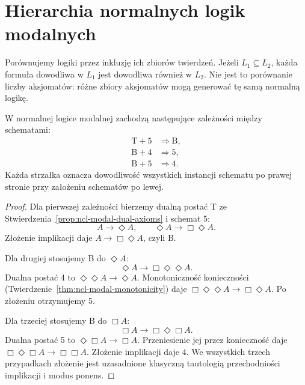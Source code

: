 \section{Hierarchia normalnych logik modalnych}

Porównujemy logiki przez inkluzję ich zbiorów twierdzeń.
Jeżeli $L_1\subseteq L_2$, każda formuła dowodliwa
w $L_1$ jest dowodliwa również w $L_2$.
Nie jest to porównanie liczby aksjomatów:
różne zbiory aksjomatów mogą generować tę samą
normalną logikę.

\begin{lemat}
\label{lem:ncl-modal-axiom-dependencies}
W normalnej logice modalnej zachodzą następujące
zależności między schematami:
\[
\begin{aligned}
 \mathrm T+5&\Longrightarrow\mathrm B,\\
 \mathrm B+4&\Longrightarrow5,\\
 \mathrm B+5&\Longrightarrow4.
\end{aligned}
\]
Każda strzałka oznacza dowodliwość wszystkich
instancji schematu po prawej stronie przy założeniu
schematów po lewej.
\end{lemat}
\begin{proof}
Dla pierwszej zależności bierzemy dualną postać T
ze Stwierdzenia~\ref{prop:ncl-modal-dual-axioms}
i schemat 5:
\[
 A\to\Diamond A,\qquad
 \Diamond A\to\Box\Diamond A.
\]
Złożenie implikacji daje $A\to\Box\Diamond A$,
czyli B.

Dla drugiej stosujemy B do $\Diamond A$:
\[
 \Diamond A\to\Box\Diamond\Diamond A.
\]
Dualna postać 4 to $\Diamond\Diamond A\to\Diamond A$.
Monotoniczność konieczności
(Twierdzenie~\ref{thm:ncl-modal-monotonicity})
daje
$\Box\Diamond\Diamond A\to\Box\Diamond A$.
Po złożeniu otrzymujemy 5.

Dla trzeciej stosujemy B do $\Box A$:
\[
 \Box A\to\Box\Diamond\Box A.
\]
Dualna postać 5 to $\Diamond\Box A\to\Box A$.
Przeniesienie jej przez konieczność daje
$\Box\Diamond\Box A\to\Box\Box A$.
Złożenie implikacji daje 4.
We wszystkich trzech przypadkach złożenie
jest uzasadnione klasyczną tautologią
przechodniości implikacji i modus ponens.
\end{proof}

